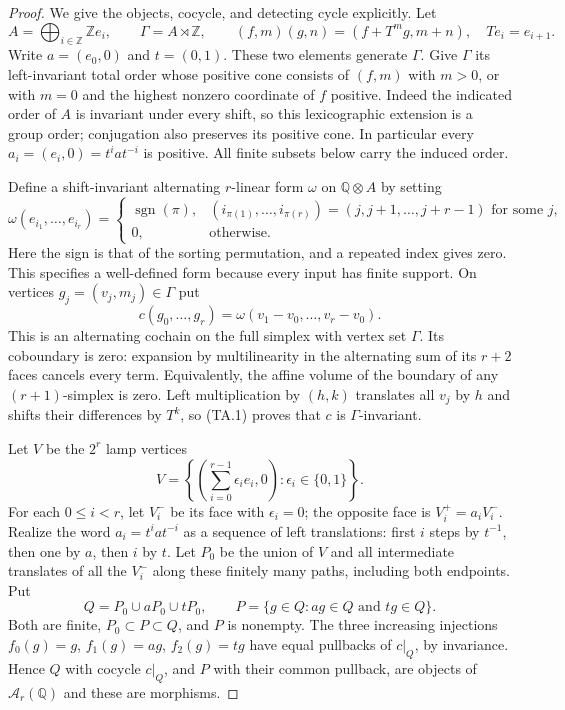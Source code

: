 \begin{proof}
We give the objects, cocycle, and detecting cycle explicitly. Let
\[
 A=\bigoplus_{i\in\mathbb Z}\mathbb Z e_i,\qquad
 \Gamma=A\rtimes\mathbb Z,
 \qquad(f,m)(g,n)=(f+T^m g,m+n),\quad Te_i=e_{i+1}.
\]
Write $a=(e_0,0)$ and $t=(0,1)$. These two elements generate
$\Gamma$. Give $\Gamma$ its left-invariant total order whose positive
cone consists of $(f,m)$ with $m>0$, or with $m=0$ and the highest
nonzero coordinate of $f$ positive. Indeed the indicated order of
$A$ is invariant under every shift, so this lexicographic extension
is a group order; conjugation also preserves its positive cone.
In particular every $a_i=(e_i,0)=t^iat^{-i}$ is positive. All finite
subsets below carry the induced order.

Define a shift-invariant alternating $r$-linear form $\omega$ on
$\mathbb Q\otimes A$ by setting
\[
 \omega(e_{i_1},\ldots,e_{i_r})=
 \begin{cases}
  \operatorname{sgn}(\pi),&
   (i_{\pi(1)},\ldots,i_{\pi(r)})=(j,j+1,\ldots,j+r-1)
   \text{ for some }j,\\
  0,&\text{otherwise}.
 \end{cases}
 \tag{TA.1}
\]
Here the sign is that of the sorting permutation, and a repeated
index gives zero. This specifies a well-defined form because every
input has finite support. On vertices $g_j=(v_j,m_j)\in\Gamma$ put
\[
 c(g_0,\ldots,g_r)
   =\omega(v_1-v_0,\ldots,v_r-v_0).
 \tag{TA.2}
\]
This is an alternating cochain on the full simplex with vertex set
$\Gamma$. Its coboundary is zero: expansion by multilinearity in
the alternating sum of its $r+2$ faces cancels every term. Equivalently,
the affine volume of the boundary of any $(r+1)$-simplex is zero.
Left multiplication by $(h,k)$ translates all $v_j$ by $h$ and
shifts their differences by $T^k$, so (TA.1) proves that $c$ is
$\Gamma$-invariant.

Let $V$ be the $2^r$ lamp vertices
\[
 V=\left\{\left(\sum_{i=0}^{r-1}\epsilon_i e_i,0\right):
                    \epsilon_i\in\{0,1\}\right\}.
\]
For each $0\leq i<r$, let $V_i^-$ be its face with $\epsilon_i=0$;
the opposite face is $V_i^+=a_i V_i^-$. Realize the word
$a_i=t^iat^{-i}$ as a sequence of left translations: first $i$
steps by $t^{-1}$, then one by $a$, then $i$ by $t$.
Let $P_0$ be the union of $V$ and all intermediate translates of
all the $V_i^-$ along these finitely many paths, including both
endpoints. Put
\[
 Q=P_0\cup aP_0\cup tP_0,\qquad
 P=\{g\in Q:ag\in Q\text{ and }tg\in Q\}.
 \tag{TA.3}
\]
Both are finite, $P_0\subset P\subset Q$, and $P$ is nonempty.
The three increasing injections $f_0(g)=g$, $f_1(g)=ag$,
$f_2(g)=tg$ have equal pullbacks of $c|_Q$, by invariance. Hence
$Q$ with cocycle $c|_Q$, and $P$ with their common pullback, are
objects of $\mathcal A_r(\mathbb Q)$ and these are morphisms.


\end{proof}

